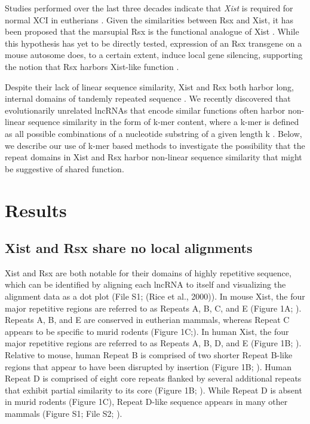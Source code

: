 Studies performed over the last three decades indicate that \textit{Xist} is required for normal XCI in eutherians \cite{Balaton2018TheChromosome,Brockdorff2018LocalNcRNA,DaRocha2017NovelConformation,Sahakyan2018TheCompensation}. Given the similarities between Rsx and Xist, it has been proposed that the marsupial Rsx is the functional analogue of Xist \cite{Grant2012RsxInactivation}. While this hypothesis has yet to be directly tested, expression of an Rsx transgene on a mouse autosome does, to a certain extent, induce local gene silencing, supporting the notion that Rsx harbors Xist-like function \cite{Grant2012RsxInactivation}.

Despite their lack of linear sequence similarity, Xist and Rsx both harbor long, internal domains of tandemly repeated sequence \cite{Grant2012RsxInactivation,Johnson2018AdaptationGenome}. We recently discovered that evolutionarily unrelated lncRNAs that encode similar functions often harbor non-linear sequence similarity in the form of k-mer content, where a k-mer is defined as all possible combinations of a nucleotide substring of a given length k \cite{Kirk2018FunctionalContent}. Below, we describe our use of k-mer based methods to investigate the possibility that the repeat domains in Xist and Rsx harbor non-linear sequence similarity that might be suggestive of shared function.

\section{Results}
\subsection{Xist and Rsx share no local alignments}
Xist and Rsx are both notable for their domains of highly repetitive sequence, which can be identified by aligning each lncRNA to itself and visualizing the alignment data as a dot plot (File S1; (Rice et al., 2000)). In mouse Xist, the four major repetitive regions are referred to as Repeats A, B, C, and E (Figure 1A; \cite{Brockdorff10TheNucleus.}). Repeats A, B, and E are conserved in eutherian mammals, whereas Repeat C appears to be specific to murid rodents (Figure 1C;\cite{Nesterova2001CharacterizationSequence,Yen2007AEutheria}). In human Xist, the four major repetitive regions are referred to as Repeats A, B, D, and E (Figure 1B; \cite{Brown10TheNucleus.}). Relative to mouse, human Repeat B is comprised of two shorter Repeat B-like regions that appear to have been disrupted by insertion (Figure 1B; \cite{Nesterova2001CharacterizationSequence,Yen2007AEutheria}). Human Repeat D is comprised of eight core repeats flanked by several additional repeats that exhibit partial similarity to its core (Figure 1B; \cite{Brown10TheNucleus.,Nesterova2001CharacterizationSequence,Yen2007AEutheria}). While Repeat D is absent in murid rodents (Figure 1C), Repeat D-like sequence appears in many other mammals (Figure S1; File S2; \cite{Nesterova2001CharacterizationSequence,Yen2007AEutheria}).

